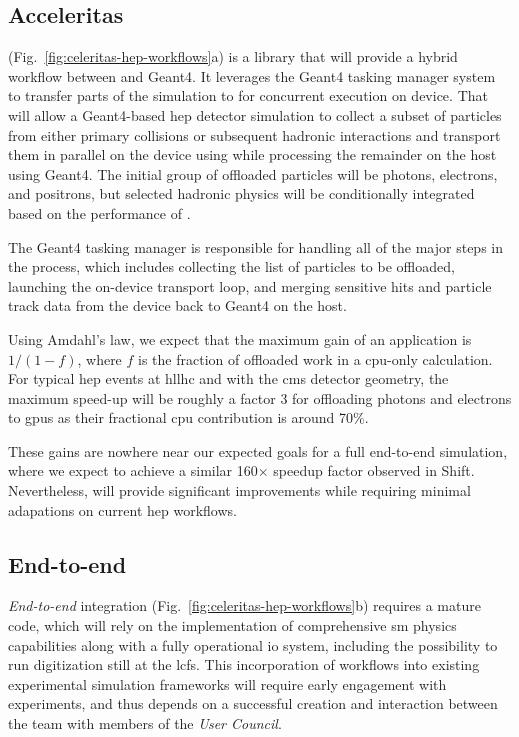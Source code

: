 \subsection{Acceleritas}
\label{sec:acceleritas}

\acceleritas (Fig.~\ref{fig:celeritas-hep-workflows}a) is a library that will
provide a hybrid workflow between \celeritas and Geant4. It leverages the Geant4
tasking manager system to transfer parts of the simulation to \celeritas for
concurrent execution on device. That will allow a Geant4-based \ac{hep} detector
simulation to collect a subset of particles from either primary collisions or
subsequent hadronic interactions and transport them in parallel on the device
using \celeritas while processing the remainder on the host using Geant4.  The
initial group of offloaded particles will be photons, electrons, and positrons,
but selected hadronic physics will be conditionally integrated based on the
performance of \acceleritas.

The Geant4 tasking manager is responsible for handling all of the major steps in
the process, which includes collecting the list of particles to be offloaded,
launching the \celeritas on-device transport loop, and merging sensitive hits
and particle track data from the device back to Geant4 on the host.

Using Amdahl's law, we expect that the maximum gain of an \acceleritas
application is $1/(1-f)$, where $f$ is the fraction of offloaded work in a
\ac{cpu}-only calculation.  For typical \ac{hep} events at \acs{hllhc} and with
the \ac{cms} detector geometry, the maximum speed-up will be roughly a factor 3
for offloading photons and electrons to \acp{gpu} as their fractional \ac{cpu}
contribution is around 70\%.

These gains are nowhere near our expected goals for a full end-to-end \celeritas
simulation, where we expect \celeritas to achieve a similar 160$\times$ speedup
factor observed in Shift. Nevertheless, \acceleritas will provide significant
improvements while requiring minimal adapations on current \ac{hep} workflows.

\subsection{End-to-end \celeritas}
\label{sec:end-to-end}

\emph{End-to-end} \celeritas integration
(Fig.~\ref{fig:celeritas-hep-workflows}b) requires a mature \celeritas code,
which will rely on the implementation of comprehensive \ac{sm} physics
capabilities along with a fully operational \ac{io} system, including the
possibility to run digitization still at the \acp{lcf}. This incorporation of
\celeritas workflows into existing experimental simulation frameworks will
require early engagement with experiments, and thus depends on a successful
creation and interaction between the \celeritas team with members of the
\emph{User Council}.


